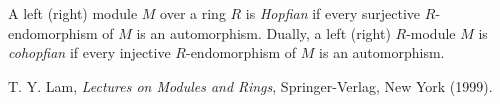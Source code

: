 \documentclass[12pt]{article}
\begin{document}

A left (right) module $M$ over a ring $R$ is \emph{Hopfian} if every surjective $R$-endomorphism of $M$ is an automorphism.  Dually, a left (right) $R$-module $M$ is \emph{cohopfian} if every injective $R$-endomorphism of $M$ is an automorphism.

\begin{thebibliography}{8}
 T. Y. Lam, {\em Lectures on Modules and Rings}, Springer-Verlag, New York (1999).
\end{thebibliography}
\end{document}
